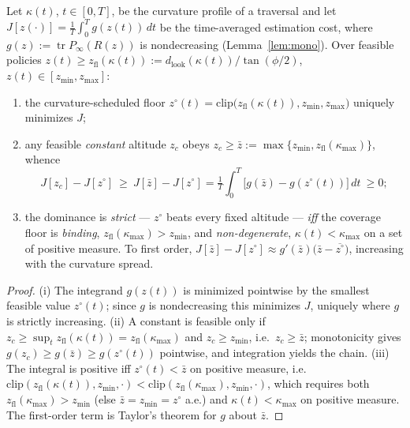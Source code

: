 \begin{proposition}\label{prop:adapt}
Let $\kappa(t)$, $t\in[0,T]$, be the curvature profile of a traversal and let
$J[z(\cdot)]=\tfrac1T\int_0^T g(z(t))\,dt$ be the time-averaged estimation cost, where
$g(z):=\operatorname{tr}P_\infty(R(z))$ is nondecreasing (Lemma~\ref{lem:mono}). Over feasible
policies $z(t)\ge z_{\mathrm{fl}}(\kappa(t)):=d_{\mathrm{look}}(\kappa(t))/\tan(\phi/2)$,
$z(t)\in[z_{\min},z_{\max}]$:
\begin{enumerate}\itemsep2pt
\item[(i)] the curvature-scheduled floor
  $z^\circ(t)=\mathrm{clip}\!\big(z_{\mathrm{fl}}(\kappa(t)),z_{\min},z_{\max}\big)$ uniquely minimizes $J$;
\item[(ii)] any feasible \emph{constant} altitude $z_c$ obeys $z_c\ge\bar z:=\max\{z_{\min},z_{\mathrm{fl}}(\kappa_{\max})\}$, whence
  \[
  J[z_c]-J[z^\circ]\ \ge\ J[\bar z]-J[z^\circ]=\tfrac1T\!\int_0^T\!\big[g(\bar z)-g(z^\circ(t))\big]\,dt\ \ge 0 ;
  \]
\item[(iii)] the dominance is \emph{strict} --- $z^\circ$ beats every fixed altitude --- \emph{iff} the coverage
  floor is \emph{binding}, $z_{\mathrm{fl}}(\kappa_{\max})>z_{\min}$, and \emph{non-degenerate},
  $\kappa(t)<\kappa_{\max}$ on a set of positive measure. To first order,
  $J[\bar z]-J[z^\circ]\approx g'(\bar z)\big(\bar z-\overline{z^\circ}\big)$, increasing with the curvature spread.
\end{enumerate}
\end{proposition}

\begin{proof}
(i) The integrand $g(z(t))$ is minimized pointwise by the smallest feasible value $z^\circ(t)$; since $g$ is
nondecreasing this minimizes $J$, uniquely where $g$ is strictly increasing. (ii) A constant is feasible only if
$z_c\ge\sup_t z_{\mathrm{fl}}(\kappa(t))=z_{\mathrm{fl}}(\kappa_{\max})$ and $z_c\ge z_{\min}$, i.e.\ $z_c\ge\bar z$;
monotonicity gives $g(z_c)\ge g(\bar z)\ge g(z^\circ(t))$ pointwise, and integration yields the chain. (iii) The
integral is positive iff $z^\circ(t)<\bar z$ on positive measure, i.e.\
$\mathrm{clip}(z_{\mathrm{fl}}(\kappa(t)),z_{\min},\cdot)<\mathrm{clip}(z_{\mathrm{fl}}(\kappa_{\max}),z_{\min},\cdot)$, which
requires both $z_{\mathrm{fl}}(\kappa_{\max})>z_{\min}$ (else $\bar z=z_{\min}=z^\circ$ a.e.) and $\kappa(t)<\kappa_{\max}$
on positive measure. The first-order term is Taylor's theorem for $g$ about $\bar z$.
\end{proof}

